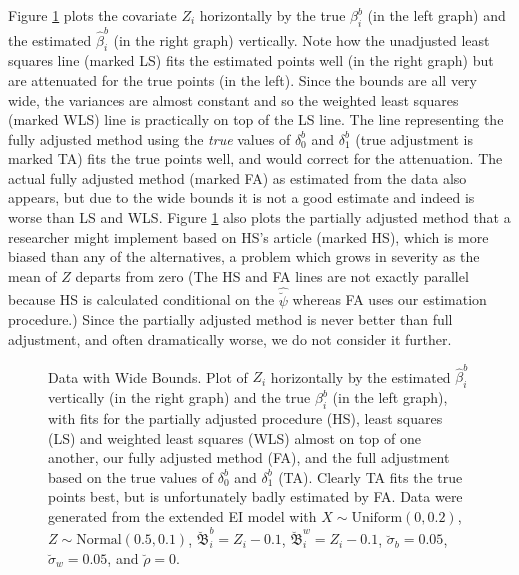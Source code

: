 \documentclass[11pt,titlepage]{article}
\newcommand{\bbeta}{{\mathfrak B}}
\newcommand{\sigmau}{\breve{\sigma}}
\newcommand{\rhou}{\breve{\rho}}
\newcommand{\psiu}{\breve{\psi}}
\begin{document}
Figure \ref{f:wide} plots the covariate $Z_i$ horizontally by the true
$\beta_i^b$ (in the left graph) and the estimated $\hat\beta_i^b$ (in
the right graph) vertically.  Note how the unadjusted least squares
line (marked LS) fits the estimated points well (in the right graph)
but are attenuated for the true points (in the left).  Since the
bounds are all very wide, the variances are almost constant and so the
weighted least squares (marked WLS) line is practically on top of the
LS line.  The line representing the fully adjusted method using the
\emph{true} values of $\delta_0^b$ and $\delta_1^b$ (true adjustment
is marked TA) fits the true points well, and would correct for the
attenuation.  The actual fully adjusted method (marked FA) as
estimated from the data also appears, but due to the wide bounds it is
not a good estimate and indeed is worse than LS and WLS.  Figure
\ref{f:wide} also plots the partially adjusted method that a
researcher might implement based on HS's article (marked HS), which is
more biased than any of the alternatives, a problem which grows in
severity as the mean of $Z$ departs from zero (The HS and FA lines are
not exactly parallel because HS is calculated conditional on the
$\hat\psiu$ whereas FA uses our estimation procedure.)  Since the
partially adjusted method is never better than full adjustment, and
often dramatically worse, we do not consider it further.
\begin{figure}[t]
  \begin{center}
    \caption{Data with Wide Bounds. Plot of $Z_i$ horizontally by
      the estimated $\hat\beta_i^b$ vertically (in the right graph)
      and the true $\beta_i^b$ (in the left graph), with fits for the
      partially adjusted procedure (HS), least squares (LS) and
      weighted least squares (WLS) almost on top of one another, our
      fully adjusted method (FA), and the full adjustment based on the
      true values of $\delta_0^b$ and $\delta_1^b$ (TA).  Clearly TA
      fits the true points best, but is unfortunately badly estimated
      by FA.  Data were generated from the extended EI model with $X
      \sim \textrm{Uniform}(0,0.2)$, $Z \sim
      \textrm{Normal}(0.5,0.1)$, $\breve\bbeta_i^b = Z_i - 0.1$,
      $\breve\bbeta_i^w = Z_i - 0.1$, $\sigmau_b = 0.05$, $\sigmau_w =
      0.05$, and $\rhou = 0$.}
    \label{f:wide}
  \end{center}
\end{figure}
\end{document}
